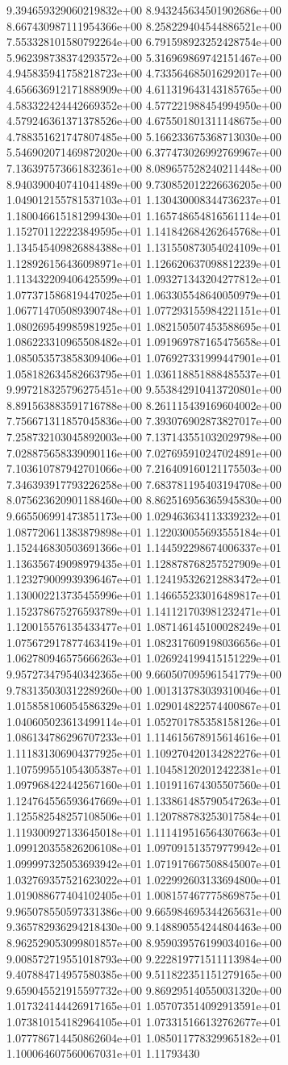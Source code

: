 	9.394659329060219832e+00	8.943245634501902686e+00	8.667430987111954366e+00	8.258229404544886521e+00	7.553328101580792264e+00	6.791598923252428754e+00	5.962398738374293572e+00	5.316969869742151467e+00	4.945835941758218723e+00	4.733564685016292017e+00	4.656636912171888909e+00	4.611319643143185765e+00	4.583322424442669352e+00	4.577221988454994950e+00	4.579246361371378526e+00	4.675501801311148675e+00	4.788351621747807485e+00	5.166233675368713030e+00	5.546902071469872020e+00	6.377473026992769967e+00	7.136397573661832361e+00	8.089657528240211448e+00	8.940390040741041489e+00	9.730852012226636205e+00	1.049012155781537103e+01	1.130430008344736237e+01	1.180046615181299430e+01	1.165748654816561114e+01	1.152701122223849595e+01	1.141842684262645768e+01	1.134545409826884388e+01	1.131550873054024109e+01	1.128926156436098971e+01	1.126620637098812239e+01	1.113432209406425599e+01	1.093271343204277812e+01	1.077371586819447025e+01	1.063305548640050979e+01	1.067714705089390748e+01	1.077293155984221151e+01	1.080269549985981925e+01	1.082150507453588695e+01	1.086223310965508482e+01	1.091969787165475658e+01	1.085053573858309406e+01	1.076927331999447901e+01	1.058182634582663795e+01	1.036118851888485537e+01	9.997218325796275451e+00	9.553842910413720801e+00	8.891563883591716788e+00	8.261115439169604002e+00	7.756671311857045836e+00	7.393076902873827017e+00	7.258732103045892003e+00	7.137143551032029798e+00	7.028875658339090116e+00	7.027695910247024891e+00	7.103610787942701066e+00	7.216409160121175503e+00	7.346393917793226258e+00	7.683781195403194708e+00	8.075623620901188460e+00	8.862516956365945830e+00	9.665506991473851173e+00	1.029463634113339232e+01	1.087720611383879898e+01	1.122030055693555184e+01	1.152446830503691366e+01	1.144592298674006337e+01	1.136356749098979435e+01	1.128878768257527909e+01	1.123279009939396467e+01	1.124195326212883472e+01	1.130002213735455996e+01	1.146655233016489817e+01	1.152378675276593789e+01	1.141121703981232471e+01	1.120015576135433477e+01	1.087146145100028249e+01	1.075672917877463419e+01	1.082317609198036656e+01	1.062780946575666263e+01	1.026924199415151229e+01	9.957273479540342365e+00	9.660507095961541779e+00	9.783135030312289260e+00	1.001313783039310046e+01	1.015858106054586329e+01	1.029014822574400867e+01	1.040605023613499114e+01	1.052701785358158126e+01	1.086134786296707233e+01	1.114615678915614616e+01	1.111831306904377925e+01	1.109270420134282276e+01	1.107599551054305387e+01	1.104581202012422381e+01	1.097968422442567160e+01	1.101911674305507560e+01	1.124764556593647669e+01	1.133861485790547263e+01	1.125582548257108506e+01	1.120788783253017584e+01	1.119300927133645018e+01	1.111419516564307663e+01	1.099120355826206108e+01	1.097091513579779942e+01	1.099997325053693942e+01	1.071917667508845007e+01	1.032769357521623022e+01	1.022992603133694800e+01	1.019088677404102405e+01	1.008157467775869875e+01	9.965078550597331386e+00	9.665984695344265631e+00	9.365782936294218430e+00	9.148890554244804463e+00	8.962529053099801857e+00	8.959039576199034016e+00	9.008572719551018793e+00	9.222819771511113984e+00	9.407884714957580385e+00	9.511822351151279165e+00	9.659045521915597732e+00	9.869295140550031320e+00	1.017324144426917165e+01	1.057073514092913591e+01	1.073810154182964105e+01	1.073315166132762677e+01	1.077786714450862604e+01	1.085011778329965182e+01	1.100064607560067031e+01	1.11793430